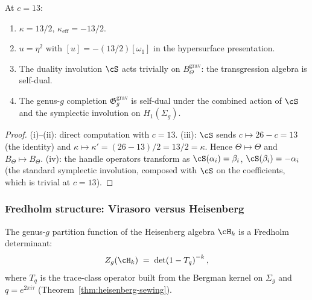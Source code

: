 \begin{proposition}[Self-dual anomaly at $c = 13$;
\ClaimStatusProvedHere]
\label{prop:gravity-c13-anomaly}
At $c = 13$:
\begin{enumerate}[label=\textup{(\roman*)}]
\item $\kappa = 13/2$, $\kappa_{\mathrm{eff}} = -13/2$.
\item $u = \eta^2$ with
 $[u] = -(13/2)[\omega_1]$ in the hypersurface
 presentation.
\item The duality involution $\cS$ acts trivially on
 $B_\Theta^{\mathrm{grav}}$: the transgression algebra is
 self-dual.
\item The genus-$g$ completion $\mathfrak{G}_g^{\mathrm{grav}}$
 is self-dual under the combined action of $\cS$ and the
 symplectic involution on $H_1(\Sigma_g)$.
\end{enumerate}
\end{proposition}

\begin{proof}
(i)--(ii): direct computation with $c = 13$.
(iii): $\cS$ sends $c \mapsto 26-c = 13$ (the identity) and
$\kappa \mapsto \kappa' = (26-13)/2 = 13/2 = \kappa$.
Hence $\Theta \mapsto \Theta$ and
$B_\Theta \mapsto B_\Theta$.
(iv): the handle operators transform as
$\cS(\alpha_i) = \beta_i$, $\cS(\beta_i) = -\alpha_i$
(the standard symplectic involution, composed with $\cS$ on the
coefficients, which is trivial at $c = 13$).
\end{proof}

\subsubsection*{Fredholm structure: Virasoro versus Heisenberg}

\begin{theorem}
\label{thm:gravity-heisenberg-fredholm}
The genus-$g$ partition function of the Heisenberg algebra
$\cH_k$ is a Fredholm determinant:
\begin{equation}\label{eq:thqg-heisenberg-fredholm}
Z_g(\cH_k)
\;=\;
\det\!\left(1 - T_q\right)^{-k},
\end{equation}
where $T_q$ is the trace-class operator built from the Bergman
kernel on $\Sigma_g$ and $q = e^{2\pi i\tau}$
\textup{(}Theorem~\textup{\ref{thm:heisenberg-sewing}}\textup{)}.
\end{theorem}

